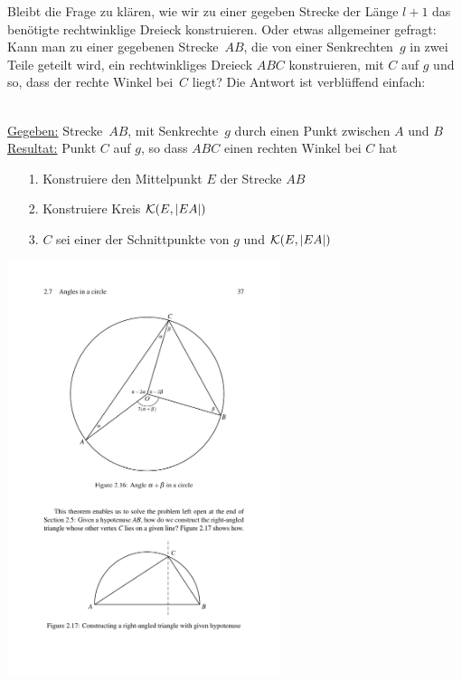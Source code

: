 Bleibt die Frage zu klären, wie wir zu einer gegeben Strecke der Länge
$l+1$ das benötigte rechtwinklige Dreieck konstruieren.
Oder etwas allgemeiner gefragt: Kann man zu einer gegebenen
Strecke~$AB$, die von einer Senkrechten~$g$ in zwei Teile geteilt wird, ein
rechtwinkliges Dreieck $ABC$ konstruieren, mit $C$ auf $g$ und so, dass
der rechte Winkel bei~$C$ liegt? Die Antwort ist verblüffend einfach:


\begin{konst}  
\phantom{Pups}\hspace*{1cm}\phantom{Pups}\\
\underline{Gegeben:} Strecke~$AB$, mit Senkrechte~$g$ %
durch einen Punkt zwischen $A$ und $B$\\ 
\underline{Resultat:} Punkt $C$ auf $g$, so dass $ABC$ einen rechten
Winkel bei $C$ hat
\begin{enumerate}
\item[1.] Konstruiere den Mittelpunkt $E$ der Strecke $AB$
\item[2.] Konstruiere Kreis ${\mathcal K}(E,|EA|)$ 
\item[3.] $C$ sei einer der Schnittpunkte von $g$ und ${\mathcal K}(E,|EA|)$
\end{enumerate}
\end{konst}

\centerline{\includegraphics[width=8cm]{BILDER/BildKreisUndRechtwinkligesDreieck.pdf}}


